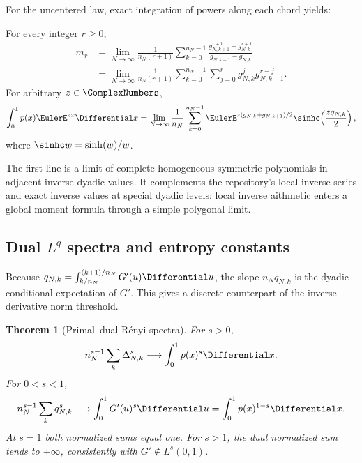 \documentclass[11pt]{article}
\newtheorem{theorem}{Theorem}[section]
\theoremstyle{definition}
\theoremstyle{remark}
\begin{document}
For the uncentered law, exact integration of powers along each chord yields:

\begin{corollary}
\label{p3:cor:inverse-moment-polygons}
For every integer $r\ge0$,
\begin{align}
 m_r
 &=\lim_{N\to\infty}\frac1{n_N(r+1)}
 \sum_{k=0}^{n_N-1}
 \frac{g_{N,k+1}^{r+1}-g_{N,k}^{r+1}}
      {g_{N,k+1}-g_{N,k}}
 \label{p3:eq:moment-quantile-chord}\\
 &=\lim_{N\to\infty}\frac1{n_N(r+1)}
 \sum_{k=0}^{n_N-1}\sum_{j=0}^r
 g_{N,k}^{j}g_{N,k+1}^{r-j}.
 \label{p3:eq:moment-quantile-homogeneous}
\end{align}
For arbitrary $z\in\ComplexNumbers$,
\begin{equation}\label{p3:eq:p-MGF-quantile-chord}
 \int_0^1p(x)\EulerE^{zx}\Differential x
 =\lim_{N\to\infty}\frac1{n_N}
 \sum_{k=0}^{n_N-1}
 \EulerE^{z(g_{N,k}+g_{N,k+1})/2}
 \sinhc\!\left(\frac{zq_{N,k}}2\right),
\end{equation}
where $\sinhc w=\sinh(w)/w$.
\end{corollary}

The first line is a limit of complete homogeneous symmetric polynomials in
adjacent inverse-dyadic values.  It complements the repository's local inverse
series and exact inverse values at special dyadic levels: local inverse
aithmetic enters a global moment formula through a simple polygonal limit.

\subsection[Dual Lq spectra and entropy constants]{Dual $L^q$ spectra and entropy constants}

Because $q_{N,k}=\int_{k/n_N}^{(k+1)/n_N}G'(u)\Differential u$, the slope
$n_Nq_{N,k}$ is the dyadic conditional expectation of $G'$.  This gives a
discrete counterpart of the inverse-derivative norm threshold.

\begin{theorem}[Primal--dual R\'enyi spectra]
\label{p3:thm:dual-Renyi}
For $s>0$,
\begin{equation}\label{p3:eq:primal-Renyi}
 n_N^{s-1}\sum_k\Delta_{N,k}^s
 \longrightarrow\int_0^1p(x)^s\Differential x.
\end{equation}
For $0<s<1$,
\begin{equation}\label{p3:eq:dual-Renyi}
 n_N^{s-1}\sum_kq_{N,k}^s
 \longrightarrow\int_0^1G'(u)^s\Differential u
 =\int_0^1p(x)^{1-s}\Differential x.
\end{equation}
At $s=1$ both normalized sums equal one.  For $s>1$, the dual normalized
sum tends to $+\infty$, consistently with $G'\notin L^s(0,1)$.
\end{theorem}
\end{document}
